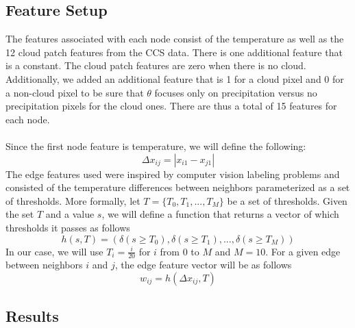\subsection{Feature Setup}

The features associated with each node consist of the temperature as well as the 12 cloud patch features from the CCS data. There is one additional feature that is a constant. The cloud patch features are zero when there is no cloud. Additionally, we added an additional feature that is 1 for a cloud pixel and 0 for a non-cloud pixel to be sure that $\theta$ focuses only on precipitation versus no precipitation pixels for the cloud ones. There are thus a total of 15 features for each node. \\
\\
Since the first node feature is temperature, we will define the following:
\[
\Delta x_{ij} = |x_{i1} - x_{j1}|
\]
The edge features used were inspired by computer vision labeling problems and consisted of the temperature differences between neighbors parameterized as a set of thresholds. More formally, let $T = \{ T_0 , T_1, ..., T_M \}$ be a set of thresholds. Given the set $T$ and a value $s$, we will define a function that returns a vector of which thresholds it passes as follows
\[
h(s,T) = ( \delta (s \geq T_0), \delta (s \geq T_1), ..., \delta (s \geq T_M))
\]
In our case, we will use $T_i = \frac{i}{20}$ for $i$ from $0$ to $M$ and $M=10$. For a given edge between neighbors $i$ and $j$, the edge feature vector will be as follows
\[
w_{ij} = h( \Delta x_{ij}, T)
\] 

\subsection{Results}

